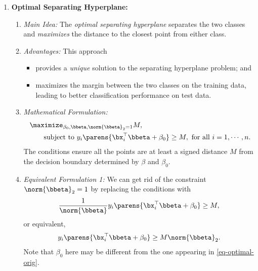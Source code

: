 \documentclass[12pt]{article}
\begin{document}
\begin{enumerate}[label=\textbf{\arabic*.}]
	\item \textbf{Optimal Separating Hyperplane:} 
	\begin{enumerate}
		\item \textit{Main Idea:} The \textit{optimal separating hyperplane} separates the two classes and \textit{maximizes} the distance to the closest point from either class. 
		\item \textit{Advantages:} This approach
		\begin{itemize}
			\item provides a \emph{unique} solution to the separating hyperplane problem; and
			\item maximizes the margin between the two classes on the training data, leading to better classification performance on test data. 
		\end{itemize}
		
		\item \textit{Mathematical Formulation:} 
		\begin{equation}
			\begin{aligned}\label{eq-optimal-orig}
				& \ \maximize_{\beta_0, \bbeta, \norm{\bbeta}_2 = 1}  M, \\ & \qquad \text{ subject to } y_i \parens{\bx_i^\top \bbeta + \beta_0} \ge M, \text{ for all } i = 1, \cdots, n. 
			\end{aligned}
		\end{equation}
		The conditions ensure all the points are at least a signed distance $M$ from the decision boundary determined by $\beta$ and $\beta_0$. 
		
		\item \textit{Equivalent Formulation 1:} We can get rid of the constraint $\norm{\bbeta}_2 = 1$ by replacing the conditions with 
		\begin{align*}
			\frac{1}{\norm{\bbeta}} y_i \parens{\bx_i^\top \bbeta + \beta_0} \ge M, 
		\end{align*}
		or equivalent, 
		\begin{align*}
			y_i \parens{\bx_i^\top \bbeta + \beta_0} \ge M \norm{\bbeta}_2. 
		\end{align*}
		Note that $\beta_0$ here may be different from the one appearing in \eqref{eq-optimal-orig}. 
		

\end{enumerate}
\end{enumerate}
\end{document}
